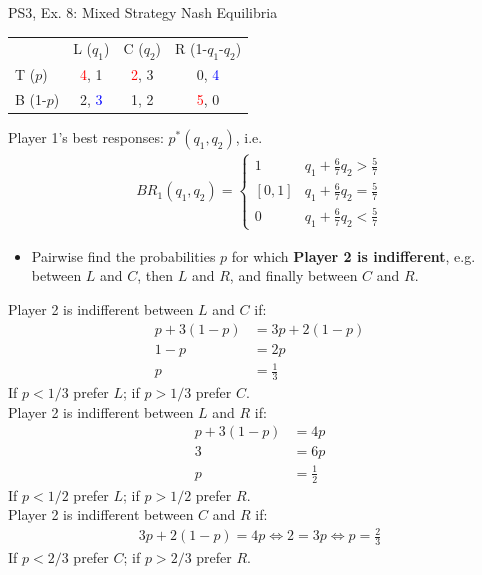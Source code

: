 \begin{frame}{PS3, Ex. 8: Mixed Strategy Nash Equilibria}
  \begin{multicols}{2}
    \begin{table}
      \begin{tabular}{l|c|c|c|}
          \multicolumn{1}{c}{}  & \multicolumn{1}{c}{L ($q_1$)} & \multicolumn{1}{c}{C ($q_2$)} & \multicolumn{1}{c}{R (1-$q_1$-$q_2$)} \\\cline{2-4}
          T ($p$)   & \textcolor{red}{4}, 1 & \textcolor{red}{2}, 3 & 0, \textcolor{blue}{4} \\\cline{2-4}
          B (1-$p$) & 2, \textcolor{blue}{3} & 1, 2 & \textcolor{red}{5}, 0 \\\cline{2-4}
      \end{tabular}
    \end{table}
    Player 1's best responses: $p^{*}(q_1,q_2)$, i.e.
    \begin{align*}
      BR_1(q_1,q_2)=
      \left\{ \begin{array}{ll}
          1                 & q_1 + \frac{6}{7}q_2 > \frac{5}{7}\\
          \left[0,1\right]  & q_1 + \frac{6}{7}q_2 = \frac{5}{7}\\
          0                 & q_1 + \frac{6}{7}q_2 < \frac{5}{7}
      \end{array}\right.
    \end{align*}
    \begin{itemize}
      \item[4.] Pairwise find the probabilities $p$ for which \textbf{Player 2 is indifferent}, e.g. between $L$ and $C$, then $L$ and $R$, and finally between $C$ and $R$.
    \end{itemize}
  \vfill\null \columnbreak
    Player 2 is indifferent between $L$ and $C$ if:
    \begin{align*}
      p+3(1-p)&= 3p + 2(1-p) \\
      1-p     &= 2p \\
      p       &= \frac{1}{3}
    \end{align*}
    If $p<1/3$ prefer $L$; if $p>1/3$ prefer $C$.\\\medskip
    Player 2 is indifferent between $L$ and $R$ if:
    \begin{align*}
      p+3(1-p)&= 4p \\
      3       &= 6p \\
      p       &= \frac{1}{2}
    \end{align*}
    If $p<1/2$ prefer $L$; if $p>1/2$ prefer $R$.\\\medskip
    Player 2 is indifferent between $C$ and $R$ if:
    \begin{align*}
      3p+2(1-p) = 4p \Leftrightarrow 2 = 3p \Leftrightarrow p = \frac{2}{3}
    \end{align*}
    If $p<2/3$ prefer $C$; if $p>2/3$ prefer $R$.\\\medskip
  \vfill\null
  \end{multicols}
\end{frame}
